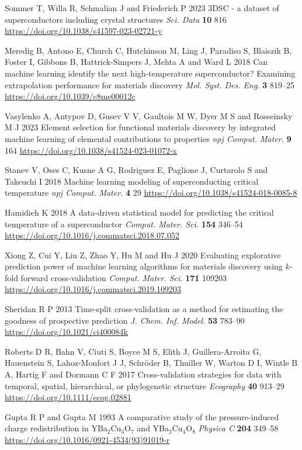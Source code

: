 
Sommer T, Willa R, Schmalian J and Friederich P 2023 3DSC - a dataset of superconductors including crystal structures
\textit{Sci. Data} \textbf{10} 816
\url{https://doi.org/10.1038/s41597-023-02721-y}

Meredig B, Antono E, Church C, Hutchinson M, Ling J, Paradiso S, Blaiszik B, Foster I, Gibbons B, Hattrick-Simpers J, Mehta A and Ward L 2018 Can machine learning identify the next high-temperature superconductor? Examining extrapolation performance for materials discovery
\textit{Mol. Syst. Des. Eng.} \textbf{3} 819--25
\url{https://doi.org/10.1039/c8me00012c}

Vasylenko A, Antypov D, Gusev V V, Gaultois M W, Dyer M S and Rosseinsky M J 2023 Element selection for functional materials discovery by integrated machine learning of elemental contributions to properties
\textit{npj Comput. Mater.} \textbf{9} 164
\url{https://doi.org/10.1038/s41524-023-01072-x}

Stanev V, Oses C, Kusne A G, Rodriguez E, Paglione J, Curtarolo S and Takeuchi I 2018 Machine learning modeling of superconducting critical temperature
\textit{npj Comput. Mater.} \textbf{4} 29
\url{https://doi.org/10.1038/s41524-018-0085-8}

Hamidieh K 2018 A data-driven statistical model for predicting the critical temperature of a superconductor
\textit{Comput. Mater. Sci.} \textbf{154} 346--54
\url{https://doi.org/10.1016/j.commatsci.2018.07.052}

Xiong Z, Cui Y, Liu Z, Zhao Y, Hu M and Hu J 2020 Evaluating explorative prediction power of machine learning algorithms for materials discovery using $k$-fold forward cross-validation
\textit{Comput. Mater. Sci.} \textbf{171} 109203
\url{https://doi.org/10.1016/j.commatsci.2019.109203}

Sheridan R P 2013 Time-split cross-validation as a method for estimating the goodness of prospective prediction
\textit{J. Chem. Inf. Model.} \textbf{53} 783--90
\url{https://doi.org/10.1021/ci400084k}

Roberts D R, Bahn V, Ciuti S, Boyce M S, Elith J, Guillera-Arroita G, Hauenstein S, Lahoz-Monfort J J, Schröder B, Thuiller W, Warton D I, Wintle B A, Hartig F and Dormann C F 2017 Cross-validation strategies for data with temporal, spatial, hierarchical, or phylogenetic structure
\textit{Ecography} \textbf{40} 913--29
\url{https://doi.org/10.1111/ecog.02881}

Gupta R P and Gupta M 1993 A comparative study of the pressure-induced charge redistribution in YBa$_{2}$Cu$_{3}$O$_{7}$ and YBa$_{2}$Cu$_{4}$O$_{8}$
\textit{Physica C} \textbf{204} 349--58
\url{https://doi.org/10.1016/0921-4534(93)91019-r}
